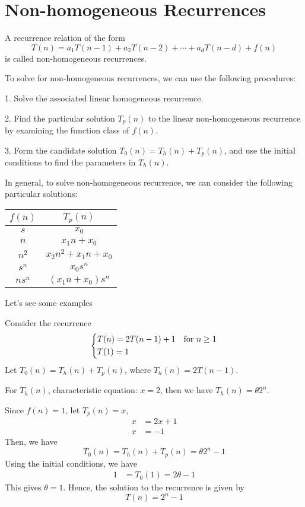 \section{Non-homogeneous Recurrences}
A recurrence relation of the form
\[
    T(n) = a_1 T(n-1) + a_2 T(n-2) + \cdots + a_d T(n-d) + f(n)
\]
is called non-homogeneous recurrences. 

To solve for non-homogeneous recurrences, we can use the following procedures:

1. Solve the associated linear homogeneous recurrence.

2. Find the particular solution \(T_p(n)\) to the linear non-homogeneous recurrence by examining the function class of \(f(n)\). 

3. Form the candidate solution \(T_0(n) = T_h(n) + T_p(n)\), and use the initial conditions to find the parameters in \(T_h(n)\).  

In general, to solve non-homogeneous recurrence, we can consider the following particular solutions:
\begin{table}[H]
    \centering
    \begin{tabular}{c|c}
        \toprule
            \(f(n)\)  & \(T_p(n)\)  \\
        \midrule
            \(s\) & \(x_0\)  \\
            \(n\) & \(x_1n + x_0\)  \\
            \(n^2\) & \(x_2n^2 + x_1n + x_0\)  \\
            \(s^n\) & \(x_0 s^n\)  \\
            \(ns^n\) & \((x_1n + x_0)s^n\) \\
        \bottomrule
    \end{tabular}
\end{table}

Let's see some examples
\begin{eg}
    Consider the recurrence
    \[
    \begin{dcases}
        T(n) = 2T(n-1) + 1\quad\text{for}\ n \geq 1\\
        T(1) = 1
    \end{dcases}
    \]
    Let \(T_0(n) = T_h(n) + T_p(n)\), where \(T_h(n) = 2T(n - 1)\). 

    For \(T_h(n)\), characteristic equation: \(x = 2\), then we have \(T_h(n) = \theta 2^n\).

    Since \(f(n) = 1\), let \(T_p(n) = x\),
    \[
        \begin{aligned}
            x &= 2x + 1 \\
            x &= -1
        \end{aligned}
    \]
    Then, we have
    \[
        T_0(n) = T_h(n) + T_p(n) = \theta 2^n - 1
    \]
    Using the initial conditions, we have
    \[
        \begin{aligned}
            1 &= T_0(1) = 2\theta - 1
        \end{aligned}
    \]
    This gives \(\theta = 1\). Hence, the solution to the recurrence is given by
    \[
        T(n) = 2^n - 1
    \]
\end{eg}


